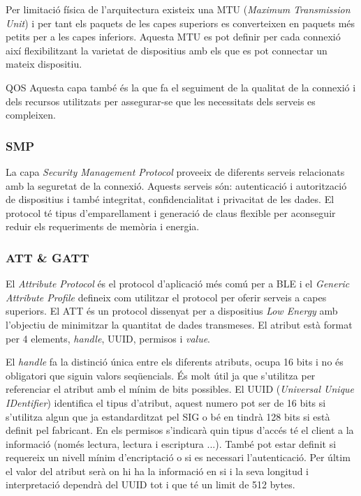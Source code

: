 Per limitació física de l'arquitectura existeix una MTU (\textit{Maximum Transmission Unit}) i per tant els paquets de les capes superiors es converteixen en paquets més petits per a les capes inferiors.
Aquesta MTU es pot definir per cada connexió així flexibilitzant la varietat de dispositius amb els que es pot connectar un mateix dispositiu.

QOS Aquesta capa també és la que fa el seguiment de la qualitat de la connexió i dels recursos utilitzats per assegurar-se que les necessitats dels serveis es compleixen.

\subsubsection{SMP}
La capa \textit{Security Management Protocol} proveeix de diferents serveis relacionats amb la seguretat de la connexió.
Aquests serveis són: autenticació i autorització de dispositius i també integritat, confidencialitat i privacitat de les dades.
El protocol té tipus d'emparellament i generació de claus flexible per aconseguir reduir els requeriments de memòria i energia.

\subsubsection{ATT \& GATT}
El \textit{Attribute Protocol} és el protocol d'aplicació més comú per a BLE i el \textit{Generic Attribute Profile} defineix com utilitzar el protocol per oferir serveis a capes superiors.
El ATT és un protocol dissenyat per a dispositius \textit{Low Energy} amb l'objectiu de minimitzar la quantitat de dades transmeses. El atribut està format per 4 elements, \textit{handle}, UUID, permisos  i \textit{value}.

El \textit{handle} fa la distinció única entre els diferents atributs, ocupa 16 bits i no és obligatori que siguin valors seqüencials. És molt útil ja que s'utilitza per referenciar el atribut amb el mínim de bits possibles.
El UUID (\textit{Universal Unique IDentifier}) identifica el tipus d'atribut, aquest numero pot ser de 16 bits si s'utilitza algun que ja estandarditzat pel SIG o bé en tindrà 128 bits si està definit pel fabricant.
En els permisos s'indicarà quin tipus d'accés té el client a la informació (només lectura, lectura i escriptura ...). També pot estar definit si requereix un nivell mínim d'encriptació o si es necessari l'autenticació.
Per últim el valor del atribut serà on hi ha la informació en si i la seva longitud i interpretació dependrà del UUID tot i que té un limit de 512 bytes.

